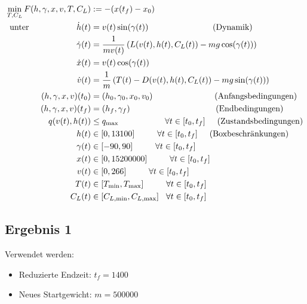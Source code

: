 \[\begin{split}
\min_{T, C_L} F(h,\gamma,x,v,T,C_L) &:= -(x(t_f) - x_0) \\\
\text{unter} \hspace{20mm} \dot{h}(t) &= v(t) \sin(\gamma(t)) \hspace{27mm} \text{(Dynamik)} \\\
\dot{\gamma}(t) &=  \dfrac{1}{mv(t)} \left( L(v(t),h(t),C_L(t)) - mg \cos(\gamma(t)) \right) \\\
\dot{x}(t) &= v(t) \cos(\gamma(t))\\\
\dot{v}(t) &= \dfrac{1}{m} \left( T(t) - D(v(t),h(t),C_L(t)) - mg \sin(\gamma(t)) \right) \\\
%
(h,\gamma,x,v)(t_0) &= (h_0,\gamma_0,x_0,v_0) \hspace{26mm} \text{(Anfangsbedingungen)}\\\
(h,\gamma,x,v)(t_f) &= (h_f,\gamma_f) \hspace{36mm} \text{(Endbedingungen)}\\\
%
q(v(t),h(t)) &\leq q_{\max} \hspace{19.5mm} \forall t \in [t_0,t_f] \hspace{5mm} \text{(Zustandsbedingungen)}\\\
h(t) &\in [0,13100] \hspace{9.5mm} \forall t \in [t_0,t_f] \hspace{5mm} \text{(Boxbeschränkungen)}\\\
\gamma(t) &\in [-90,90] \hspace{9.5mm} \forall t \in [t_0,t_f]\\\
x(t) &\in [0,15200000] \hspace{9.5mm} \forall t \in [t_0,t_f]\\\
v(t) &\in [0,266] \hspace{9.5mm} \forall t \in [t_0,t_f]\\\
T(t) &\in [T_{\min},T_{\max}] \hspace{9.5mm} \forall t \in [t_0,t_f]\\\
C_L(t) &\in [C_{L, \min},C_{L, \max}] \hspace{3mm} \forall t \in [t_0,t_f]
\end{split} \]

\subsection{Ergebnis 1}
Verwendet werden:
\begin{itemize}
\item Reduzierte Endzeit: $t_f = 1400$
\item Neues Startgewicht: $m = 500000$
\end{itemize}

